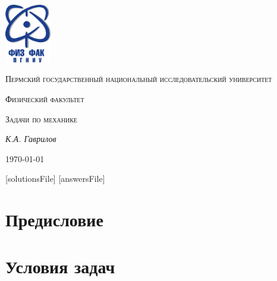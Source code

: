 \documentclass[a5paper, oneside]{book}
\begin{document}
\begin{titlepage}
	\centering
	\includegraphics[width=0.15\textwidth]{logo.png}\par\vspace{1cm}
	{\scshape Пермский государственный национальный исследовательский университет\par}
	\vspace{0.5cm}
	{\scshape Физический факультет \par}
	\vspace{1cm}
	{\scshape\LARGE Задачи по механике\par}
	\vspace{2cm}
	{\Large\itshape К.А. Гаврилов\par}
	\vfill
	{\large \today\par}
\end{titlepage}

\tableofcontents    %

[solutionsFile]
[answersFile]

\chapter*{Предисловие}


\chapter*{Условия задач}












\end{document}

